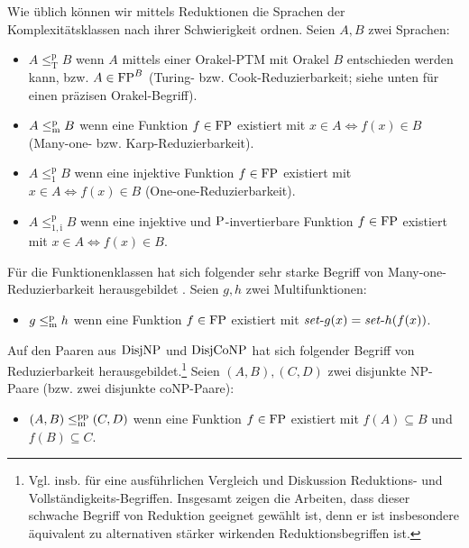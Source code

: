 Wie üblich können wir mittels Reduktionen die Sprachen der Komplexitätsklassen nach ihrer Schwierigkeit ordnen. Seien $A,B$ zwei Sprachen:
\begin{itemize}
    \item $A\leq_\mathrm{T}^\mathrm{p} B$ wenn $A$ mittels einer Orakel-PTM mit Orakel $B$ entschieden werden kann, bzw. $A\in\FP^B$ (Turing- bzw. Cook-Reduzierbarkeit; siehe unten für einen präzisen Orakel-Begriff).
    \item $A\leqmp B$ wenn eine Funktion $f\in\FP$ existiert mit $x\in A\iff f(x)\in B$ (Many-one- bzw. Karp-Reduzierbarkeit).
    \item $A\leq_1^\mathrm{p} B$ wenn eine injektive Funktion $f\in\FP$ existiert mit $x\in A\iff f(x)\in B$ (One-one-Reduzierbarkeit).
    \item $A\leq_\mathrm{1,i}^\mathrm{p} B$ wenn eine injektive und $\P$-invertierbare Funktion $f\in\FP$ existiert mit $x\in A\iff f(x)\in B$.
\end{itemize}
Für die Funktionenklassen hat sich folgender sehr starke Begriff von Many-one-Reduzierbarkeit herausgebildet \parencites(vgl.)(){kobler_is_2000}{beyersdorff_nondeterministic_2009}{pudlak_incompleteness_2017}. Seien $g,h$ zwei Multifunktionen:
\begin{itemize}
    \item $g\leqmp h$ wenn eine Funktion $f\in\FP$ existiert mit $\fset{}g(x)=\fset{}h(f(x))$.
\end{itemize}
Auf den Paaren aus $\DisjNP$ und $\DisjCoNP$ hat sich folgender Begriff von Reduzierbarkeit herausgebildet.\footnote{Vgl. insb. \textcites{glaser_disjoint_2004}{glaser_reductions_2005} für eine ausführlichen Vergleich und Diskussion Reduktions- und Vollständigkeits-Begriffen. Insgesamt zeigen die Arbeiten,  dass dieser schwache Begriff von Reduktion geeignet gewählt ist, denn er ist insbesondere äquivalent zu alternativen stärker wirkenden Reduktionsbegriffen ist.}
Seien $(A,B), (C,D)$ zwei disjunkte NP-Paare (bzw. zwei disjunkte coNP-Paare):
\begin{itemize}
    \item $(A,B)\leqmpp(C,D)$ wenn eine Funktion $f\in\FP$ existiert mit $f(A)\subseteq B$ und $f(B)\subseteq C$.
\end{itemize}

